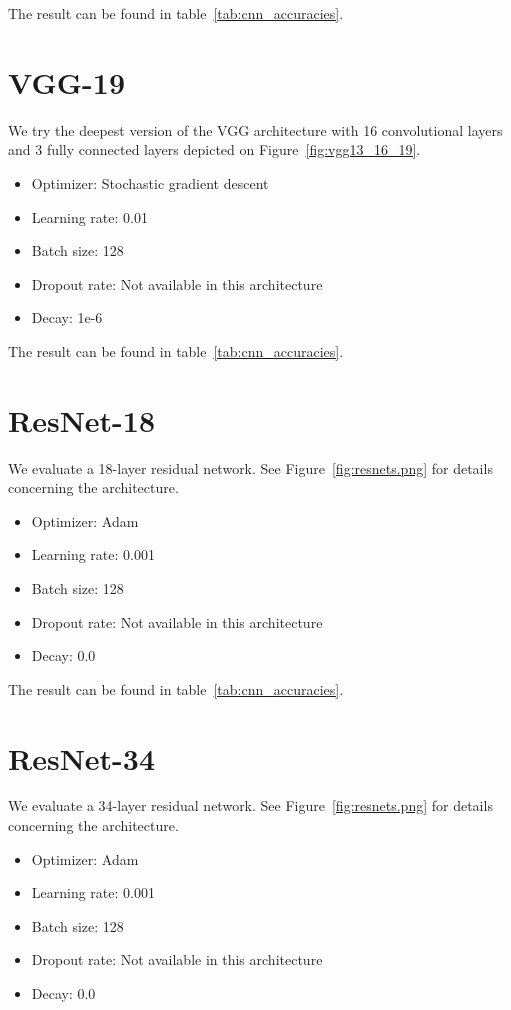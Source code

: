 The result can be found in table~\ref{tab:cnn_accuracies}.

\section{VGG-19}
We try the deepest version of the VGG architecture with 16 convolutional layers and 3 fully connected layers depicted on Figure~\ref{fig:vgg13_16_19}.

\begin{itemize}
  \item Optimizer: Stochastic gradient descent
  \item Learning rate: 0.01
  \item Batch size: 128
  \item Dropout rate: Not available in this architecture
  \item Decay: 1e-6
\end{itemize}

The result can be found in table~\ref{tab:cnn_accuracies}.

\section{ResNet-18}
We evaluate a 18-layer residual network. See Figure~\ref{fig:resnets.png} for details concerning the architecture.

\begin{itemize}
  \item Optimizer: Adam
  \item Learning rate: 0.001
  \item Batch size: 128
  \item Dropout rate: Not available in this architecture
  \item Decay: 0.0
\end{itemize}

The result can be found in table~\ref{tab:cnn_accuracies}.

\section{ResNet-34}
We evaluate a 34-layer residual network. See Figure~\ref{fig:resnets.png} for details concerning the architecture.

\begin{itemize}
  \item Optimizer: Adam
  \item Learning rate: 0.001
  \item Batch size: 128
  \item Dropout rate: Not available in this architecture
  \item Decay: 0.0
\end{itemize}


